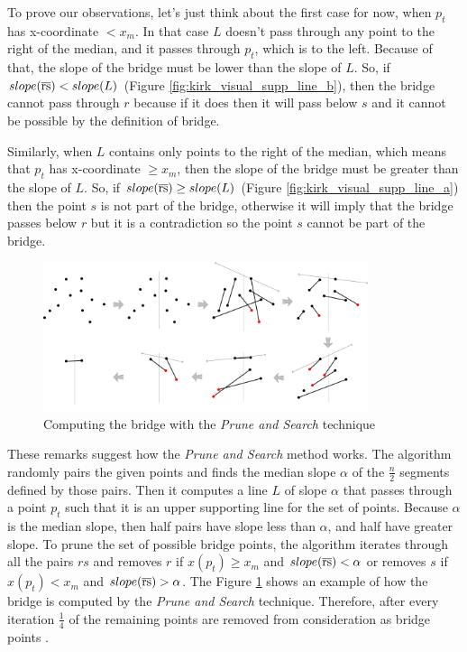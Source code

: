 \documentclass{article}
\begin{document}
To prove our observations, let's just think about the first case for now, when $p_t$ has x-coordinate $< x_{m}$. In that case $L$ doesn't pass through any point to the right of the median, and it passes through $p_t$, which is to the left. Because of that, the slope of the bridge must be lower than the slope of $L$. So, if $slope(\overline{\rm rs}) < slope(L)$ (Figure \ref{fig:kirk_visual_supp_line_b}), then the bridge cannot pass through $r$ because if it does then it will pass below $s$ and it cannot be possible by the definition of bridge. 

Similarly, when $L$ contains only points to the right of the median, which means that $p_t$ has x-coordinate $\geq x_{m}$, then the slope of the bridge must be greater than the slope of $L$. So, if $slope(\overline{\rm rs}) \geq slope(L)$ (Figure \ref{fig:kirk_visual_supp_line_a}) then the point $s$ is not part of the bridge, otherwise it will imply that the bridge passes below $r$ but it is a contradiction so the point $s$ cannot be part of the bridge.

\begin{figure}[h]
\centering
\includegraphics[width=0.85\textwidth]{kirk/kirk_visual_bridge.png}
\caption{\label{fig:kirk_visual_bridge}Computing the bridge with the \textit{Prune and Search} technique}
\end{figure}

These remarks suggest how the \textit{Prune and Search} method works. The algorithm randomly pairs the given points and finds the median slope $\alpha$ of the $\frac{n}{2}$ segments defined by those pairs. Then it computes a line $L$ of slope $\alpha$ that passes through a point $p_t$ such that it is an upper supporting line for the set of points. Because $\alpha$ is the median slope, then half pairs have slope less than $\alpha$, and half have greater slope. To prune the set of possible bridge points, the algorithm iterates through all the pairs $rs$ and removes $r$ if $x(p_t) \geq x_m$ and $slope(\overline{\rm rs}) < \alpha$ or removes $s$ if $x(p_t) < x_m$ and $slope(\overline{\rm rs}) > \alpha$. The Figure \ref{fig:kirk_visual_bridge} shows an example of how the bridge is computed by the \textit{Prune and Search} technique. Therefore, after every iteration $\frac{1}{4}$ of the remaining points are removed from consideration as bridge points \cite{kirk_tufts}.
\end{document}
